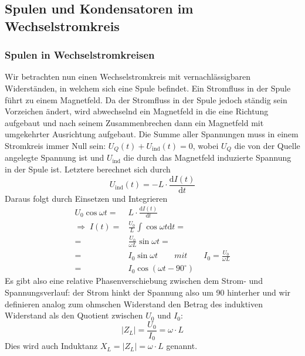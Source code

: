 
\subsection{Spulen und Kondensatoren im Wechselstromkreis}

\subsubsection{Spulen in Wechselstromkreisen}
Wir betrachten nun einen Wechselstromkreis mit vernachlässigbaren Widerständen, in welchem sich eine Spule befindet. Ein Stromfluss in der Spule führt zu einem Magnetfeld. Da der Stromfluss in der Spule jedoch ständig sein Vorzeichen ändert, wird abwechselnd ein Magnetfeld in die eine Richtung aufgebaut und nach seinem Zusammenbrechen dann ein Magnetfeld mit umgekehrter Ausrichtung aufgebaut.
Die Summe aller Spannungen muss in einem Stromkreis immer Null sein:
$ U_Q(t) + U_\mathrm{ind}(t) = 0 $,
wobei $U_Q$ die von der Quelle angelegte Spannung ist und $U_\mathrm{ind}$ die durch das Magnetfeld induzierte Spannung in der Spule ist. Letztere berechnet sich durch
\begin{equation}
U_\mathrm{ind}(t) = - L \cdot \frac{\mathrm dI(t)}{\mathrm dt}
\end{equation}
Daraus folgt durch Einsetzen und Integrieren\cite{Demtroeder}
\begin{align}
U_0 \cos \omega t =& L \cdot \frac{\mathrm dI(t)}{\mathrm dt} \nonumber \\ 
\Rightarrow\; I(t) =& \frac{U_0}{L} \int \cos \omega t \mathrm dt = \nonumber \\ 
=& \frac{U_0}{\omega L} \sin \omega t = \nonumber\\
=& I_0 \sin \omega t \qquad mit\qquad I_0 = \frac{U_0}{\omega L}  \nonumber\\
=& I_0 \cos(\omega t - 90^\circ)
\end{align}
Es gibt also eine relative Phasenverschiebung zwischen dem Strom- und Spannungsverlauf: der Strom hinkt der Spannung also um \unit{90}{\degree} hinterher und wir definieren analog zum ohmschen Widerstand den Betrag des induktiven Widerstand als den Quotient zwischen $U_0$ und $I_0$:
\begin{equation}
\left|Z_L\right| = \frac{U_0}{I_0} = \omega \cdot L
\end{equation}
Dies wird auch Induktanz $X_L = \left|Z_L\right| = \omega \cdot L$ genannt.

